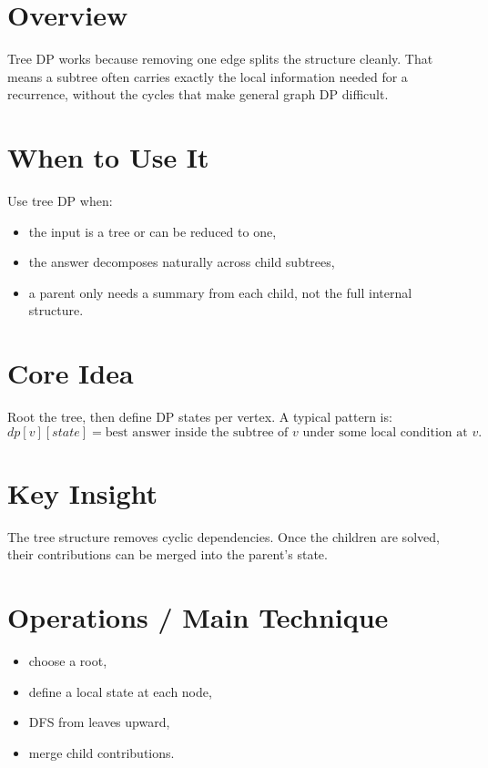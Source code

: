 \section*{Overview}

Tree DP works because removing one edge splits the structure cleanly. That means a subtree often carries exactly the
local information needed for a recurrence, without the cycles that make general graph DP difficult.

\section*{When to Use It}

Use tree DP when:

\begin{itemize}
  \item the input is a tree or can be reduced to one,
  \item the answer decomposes naturally across child subtrees,
  \item a parent only needs a summary from each child, not the full internal structure.
\end{itemize}

\section*{Core Idea}

Root the tree, then define DP states per vertex. A typical pattern is:
\[
dp[v][state] = \text{best answer inside the subtree of } v \text{ under some local condition at } v.
\]

\section*{Key Insight}

The tree structure removes cyclic dependencies. Once the children are solved, their contributions can be merged into
the parent's state.

\section*{Operations / Main Technique}

\begin{itemize}
  \item choose a root,
  \item define a local state at each node,
  \item DFS from leaves upward,
  \item merge child contributions.
\end{itemize}

